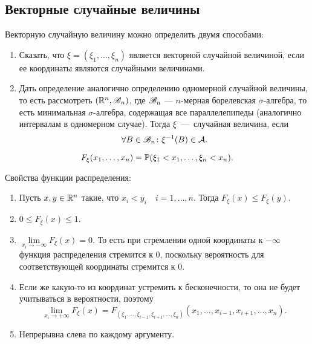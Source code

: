 \documentclass[../TV&MS.tex]{subfiles}
\begin{document}
\subsection{Векторные случайные величины}

	Векторную случайную величину можно определить двумя способами:
\begin{enumerate}
	\item Сказать, что $\xi = (\xi_1, \ldots, \xi_n)$ является векторной 
	случайной величиной, если ее координаты являются случайными величинами.

	\item Дать определение аналогично определению одномерной случайной величины, 
	то есть рассмотреть $(\mathbb{R}^n, \mathscr{B}_n)$, где $\mathscr{B}_n$ --- $n$-мерная борелевская
	$\sigma$-алгебра, то есть минимальная $\sigma$-алгебра, содержащая все 
	параллелепипеды (аналогично интервалам в одномерном случае). 
	Тогда $\xi$~---~случайная величина, если 
	$$\forall B \in \mathscr{B}_n \colon \xi^{-1}(B) \in \mathcal{A}.$$ 
\end{enumerate}

\begin{Def}
	$$F_\xi(x_1, \ldots, x_n) = \mathbb{P}(\xi_1 < x_1, \ldots, \xi_n < x_n).$$
\end{Def}

	Свойства функции распределения:
\begin{enumerate}
	\item Пусть $x, y \in \mathbb{R}^n$ такие, что $x_i < y_i \quad i = 1, \ldots, n$. 
	Тогда $F_\xi(x) \leqslant F_\xi(y)$.

	\item $0 \leqslant F_\xi(x) \leqslant 1$.
	
	\item $\lim\limits_{x_i \to -\infty} F_\xi(x) = 0$. То есть при стремлении одной 
	координаты к $-\infty$ функция распределения стремится к $0$, поскольку вероятность 
	для соответствующей координаты стремится к $0$.
	
	\item Если же какую-то из координат устремить к бесконечности, то она не будет 
	учитываться в вероятности, поэтому
	$$\lim\limits_{x_i \to +\infty} F_\xi(x) = F_{(\xi_1, \ldots, \xi_{i-1}, \xi_{i+1}, 
	\ldots, \xi_n)}(x_1, \ldots, x_{i-1}, x_{i+1}, \ldots, x_n).$$

	\item Непрерывна слева по каждому аргументу.
\end{enumerate}
\end{document}
